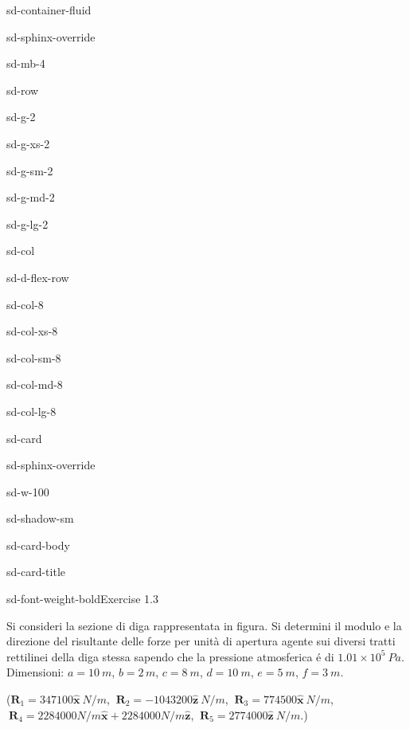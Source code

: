 \documentclass[letterpaper,10pt,italian]{jupyterBook}
\begin{document}
\begin{sphinxuseclass}{sd-container-fluid}
\begin{sphinxuseclass}{sd-sphinx-override}
\begin{sphinxuseclass}{sd-mb-4}
\begin{sphinxuseclass}{sd-row}
\begin{sphinxuseclass}{sd-g-2}
\begin{sphinxuseclass}{sd-g-xs-2}
\begin{sphinxuseclass}{sd-g-sm-2}
\begin{sphinxuseclass}{sd-g-md-2}
\begin{sphinxuseclass}{sd-g-lg-2}
\begin{sphinxuseclass}{sd-col}
\begin{sphinxuseclass}{sd-d-flex-row}
\begin{sphinxuseclass}{sd-col-8}
\begin{sphinxuseclass}{sd-col-xs-8}
\begin{sphinxuseclass}{sd-col-sm-8}
\begin{sphinxuseclass}{sd-col-md-8}
\begin{sphinxuseclass}{sd-col-lg-8}
\begin{sphinxuseclass}{sd-card}
\begin{sphinxuseclass}{sd-sphinx-override}
\begin{sphinxuseclass}{sd-w-100}
\begin{sphinxuseclass}{sd-shadow-sm}
\begin{sphinxuseclass}{sd-card-body}
\begin{sphinxuseclass}{sd-card-title}
\begin{sphinxuseclass}{sd-font-weight-bold}Exercise 1.3
\end{sphinxuseclass}
\end{sphinxuseclass}
\sphinxAtStartPar
Si consideri la sezione di diga rappresentata in figura.
Si determini il modulo e la direzione del risultante
delle forze per unità di apertura agente sui diversi
tratti rettilinei della diga stessa sapendo che la pressione
atmosferica é di \(1.01 \times 10^5\ Pa\). Dimensioni: \(a=10\ m\),
\(b=2\, m\), \(c=8\ m\), \(d=10\ m\), \(e=5\ m\), \(f=3\ m\).

\sphinxAtStartPar
(\(\mathbf{R}_1=347100\hat{\mathbf{x}}\  N/m\),
\(\ \mathbf{R}_2=- 1043200\hat{\mathbf{z}}\ N/m\),
\(\ \mathbf{R}_3=774500\hat{\mathbf{x}}\ N/m\),
\(\ \mathbf{R}_4=2284000 N/m \mathbf{\hat{x}} + 2284000 N/m \mathbf{\hat{z}}\),
\(\ \mathbf{R}_5=2774000\hat{\mathbf{z}}\ N/m\).)


\end{sphinxuseclass}
\end{sphinxuseclass}
\end{sphinxuseclass}
\end{sphinxuseclass}
\end{sphinxuseclass}
\end{sphinxuseclass}
\end{sphinxuseclass}
\end{sphinxuseclass}
\end{sphinxuseclass}
\end{sphinxuseclass}
\end{sphinxuseclass}
\end{sphinxuseclass}
\end{sphinxuseclass}
\end{sphinxuseclass}
\end{sphinxuseclass}
\end{sphinxuseclass}
\end{sphinxuseclass}
\end{sphinxuseclass}
\end{sphinxuseclass}
\end{sphinxuseclass}
\end{sphinxuseclass}
\end{document}
